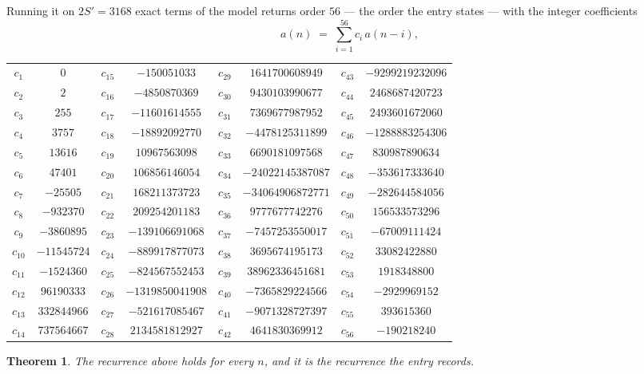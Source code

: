 \documentclass[11pt,a4paper]{article}
\theoremstyle{plain}
\newtheorem{theorem}{Theorem}
\theoremstyle{definition}
\begin{document}
Running it on $2S'=3168$ exact terms of the model returns order $56$ --- the order the
entry states --- with the integer coefficients
\[
a(n)\;=\;\sum_{i=1}^{56}c_i\,a(n-i),
\]
\begin{center}\small
\begin{tabular}{cccccccc}
$c_{1}$ & $0$ & $c_{15}$ & $-150051033$ & $c_{29}$ & $1641700608949$ & $c_{43}$ & $-9299219232096$ \\
$c_{2}$ & $2$ & $c_{16}$ & $-4850870369$ & $c_{30}$ & $9430103990677$ & $c_{44}$ & $2468687420723$ \\
$c_{3}$ & $255$ & $c_{17}$ & $-11601614555$ & $c_{31}$ & $7369677987952$ & $c_{45}$ & $2493601672060$ \\
$c_{4}$ & $3757$ & $c_{18}$ & $-18892092770$ & $c_{32}$ & $-4478125311899$ & $c_{46}$ & $-1288883254306$ \\
$c_{5}$ & $13616$ & $c_{19}$ & $10967563098$ & $c_{33}$ & $6690181097568$ & $c_{47}$ & $830987890634$ \\
$c_{6}$ & $47401$ & $c_{20}$ & $106856146054$ & $c_{34}$ & $-24022145387087$ & $c_{48}$ & $-353617333640$ \\
$c_{7}$ & $-25505$ & $c_{21}$ & $168211373723$ & $c_{35}$ & $-34064906872771$ & $c_{49}$ & $-282644584056$ \\
$c_{8}$ & $-932370$ & $c_{22}$ & $209254201183$ & $c_{36}$ & $9777677742276$ & $c_{50}$ & $156533573296$ \\
$c_{9}$ & $-3860895$ & $c_{23}$ & $-139106691068$ & $c_{37}$ & $-7457253550017$ & $c_{51}$ & $-67009111424$ \\
$c_{10}$ & $-11545724$ & $c_{24}$ & $-889917877073$ & $c_{38}$ & $3695674195173$ & $c_{52}$ & $33082422880$ \\
$c_{11}$ & $-1524360$ & $c_{25}$ & $-824567552453$ & $c_{39}$ & $38962336451681$ & $c_{53}$ & $1918348800$ \\
$c_{12}$ & $96190333$ & $c_{26}$ & $-1319850041908$ & $c_{40}$ & $-7365829224566$ & $c_{54}$ & $-2929969152$ \\
$c_{13}$ & $332844966$ & $c_{27}$ & $-521617085467$ & $c_{41}$ & $-9071328727397$ & $c_{55}$ & $393615360$ \\
$c_{14}$ & $737564667$ & $c_{28}$ & $2134581812927$ & $c_{42}$ & $4641830369912$ & $c_{56}$ & $-190218240$ \\
\end{tabular}
\end{center}

\begin{theorem}
The recurrence above holds for every $n$, and it is the recurrence the entry records.
\end{theorem}
\end{document}
